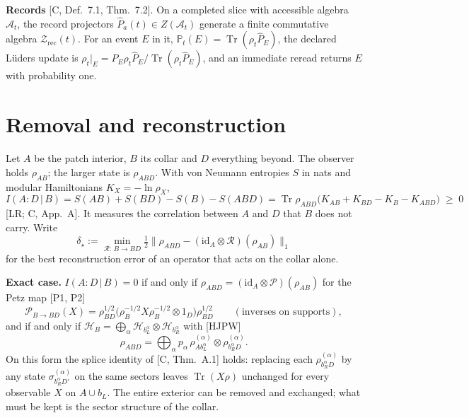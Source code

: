 \documentclass[11pt]{article}
\newcommand{\id}{\mathrm{id}}
\newcommand{\Tr}{\operatorname{Tr}}
\newcommand{\cit}[1]{[#1]}
\begin{document}
\textbf{Records} \cit{C, Def.~7.1, Thm.~7.2}. On a completed slice with accessible
algebra $\mathcal A_t$, the record projectors $\widehat P_a(t)\in Z(\mathcal A_t)$
generate a finite commutative algebra $\mathcal Z_{\mathrm{rec}}(t)$. For an event
$E$ in it, $\mathbb P_t(E)=\Tr(\rho_t\widehat P_E)$, the declared L\"uders update is
$\rho_t|_E=\widehat P_E\rho_t\widehat P_E/\Tr(\rho_t\widehat P_E)$, and an immediate
reread returns $E$ with probability one.

\section{Removal and reconstruction}

Let $A$ be the patch interior, $B$ its collar and $D$ everything beyond. The observer
holds $\rho_{AB}$; the larger state is $\rho_{ABD}$. With von Neumann entropies $S$
in nats and modular Hamiltonians $K_X=-\ln\rho_X$,
\[
I(A{:}D\,|\,B)=S(AB)+S(BD)-S(B)-S(ABD)
=\Tr\rho_{ABD}\bigl(K_{AB}+K_{BD}-K_B-K_{ABD}\bigr)\;\ge\;0
\]
\cit{LR; C, App.~A}. It measures the correlation between $A$ and $D$ that $B$ does
not carry. Write
\[
\delta_\star:=\min_{\mathcal R:\,B\to BD}\tfrac12\bigl\|\rho_{ABD}-(\id_A\otimes\mathcal R)(\rho_{AB})\bigr\|_1
\]
for the best reconstruction error of an operator that acts on the collar alone.

\textbf{Exact case.} $I(A{:}D\,|\,B)=0$ if and only if
$\rho_{ABD}=(\id_A\otimes\mathcal P)(\rho_{AB})$ for the Petz map \cit{P1, P2}
\[
\mathcal P_{B\to BD}(X)=\rho_{BD}^{1/2}\bigl(\rho_B^{-1/2}X\rho_B^{-1/2}\otimes 1_D\bigr)\rho_{BD}^{1/2}
\qquad(\text{inverses on supports}),
\]
and if and only if
$\mathcal H_B=\bigoplus_\alpha\mathcal H_{b_L^\alpha}\otimes\mathcal H_{b_R^\alpha}$ with
\cit{HJPW}
\[
\rho_{ABD}=\bigoplus_\alpha p_\alpha\,\rho^{(\alpha)}_{Ab_L^\alpha}\otimes\rho^{(\alpha)}_{b_R^\alpha D}.
\]
On this form the splice identity of \cit{C, Thm.~A.1} holds: replacing each
$\rho^{(\alpha)}_{b_R^\alpha D}$ by any state $\sigma^{(\alpha)}_{b_R^\alpha D'}$ on
the same sectors leaves $\Tr(X\rho)$ unchanged for every observable $X$ on
$A\cup b_L$. The entire exterior can be removed and exchanged; what must be kept is
the sector structure of the collar.
\end{document}
